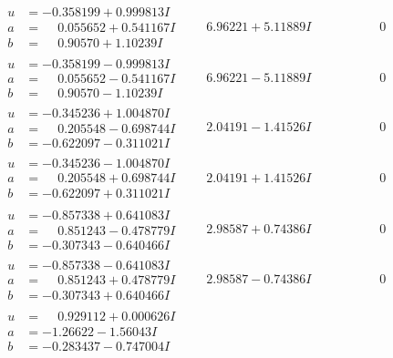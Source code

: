 \documentclass[1p]{elsarticle_modified}
\theoremstyle{definition}
\begin{document}
$$\begin{array}{c|c|c}
\begin{aligned}
u &= -0.358199 + 0.999813 I \\
a &= \phantom{-}0.055652 + 0.541167 I \\
b &= \phantom{-}0.90570 + 1.10239 I\end{aligned}
 & \phantom{-}6.96221 + 5.11889 I & \phantom{-0.000000 } 0 \\ \hline\begin{aligned}
u &= -0.358199 - 0.999813 I \\
a &= \phantom{-}0.055652 - 0.541167 I \\
b &= \phantom{-}0.90570 - 1.10239 I\end{aligned}
 & \phantom{-}6.96221 - 5.11889 I & \phantom{-0.000000 } 0 \\ \hline\begin{aligned}
u &= -0.345236 + 1.004870 I \\
a &= \phantom{-}0.205548 - 0.698744 I \\
b &= -0.622097 - 0.311021 I\end{aligned}
 & \phantom{-}2.04191 - 1.41526 I & \phantom{-0.000000 } 0 \\ \hline\begin{aligned}
u &= -0.345236 - 1.004870 I \\
a &= \phantom{-}0.205548 + 0.698744 I \\
b &= -0.622097 + 0.311021 I\end{aligned}
 & \phantom{-}2.04191 + 1.41526 I & \phantom{-0.000000 } 0 \\ \hline\begin{aligned}
u &= -0.857338 + 0.641083 I \\
a &= \phantom{-}0.851243 - 0.478779 I \\
b &= -0.307343 - 0.640466 I\end{aligned}
 & \phantom{-}2.98587 + 0.74386 I & \phantom{-0.000000 } 0 \\ \hline\begin{aligned}
u &= -0.857338 - 0.641083 I \\
a &= \phantom{-}0.851243 + 0.478779 I \\
b &= -0.307343 + 0.640466 I\end{aligned}
 & \phantom{-}2.98587 - 0.74386 I & \phantom{-0.000000 } 0 \\ \hline\begin{aligned}
u &= \phantom{-}0.929112 + 0.000626 I \\
a &= -1.26622 - 1.56043 I \\
b &= -0.283437 - 0.747004 I\end{aligned}

\end{array}$$
\end{document}
